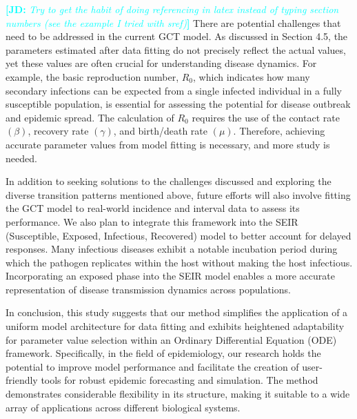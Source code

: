 \documentclass[12pt]{article}
\newcommand{\comment}{\showcomment}
\newcommand{\showcomment}[3]{\textcolor{#1}{\textbf{[#2: }\textsl{#3}\textbf{]}}}
\newcommand{\jd}[1]{\comment{cyan}{JD}{#1}}
\begin{document}
\jd{Try to get the habit of doing referencing in latex instead of typing section numbers (see the example I tried with sref)}
There are potential challenges that need to be addressed in the current GCT model. As discussed in Section 4.5, the parameters estimated after data fitting do not precisely reflect the actual values, yet these values are often crucial for understanding disease dynamics. For example, the basic reproduction number, $R_0$, which indicates how many secondary infections can be expected from a single infected individual in a fully susceptible population, is essential for assessing the potential for disease outbreak and epidemic spread. The calculation of $R_0$ requires the use of the contact rate $(\beta)$, recovery rate $(\gamma)$, and birth/death rate $(\mu)$. Therefore, achieving accurate parameter values from model fitting is necessary, and more study is needed.

In addition to seeking solutions to the challenges discussed and exploring the diverse transition patterns mentioned above, future efforts will also involve fitting the GCT model to real-world incidence and interval data to assess its performance. We also plan to integrate this framework into the SEIR (Susceptible, Exposed, Infectious, Recovered) model to better account for delayed responses. Many infectious diseases exhibit a notable incubation period during which the pathogen replicates within the host without making the host infectious. Incorporating an exposed phase into the SEIR model enables a more accurate representation of disease transmission dynamics across populations.

In conclusion, this study suggests that our method simplifies the application of a uniform model architecture for data fitting and exhibits heightened adaptability for parameter value selection within an Ordinary Differential Equation (ODE) framework. Specifically, in the field of epidemiology, our research holds the potential to improve model performance and facilitate the creation of user-friendly tools for robust epidemic forecasting and simulation. The method demonstrates considerable flexibility in its structure, making it suitable to a wide array of applications across different biological systems. 


 
\end{document}
